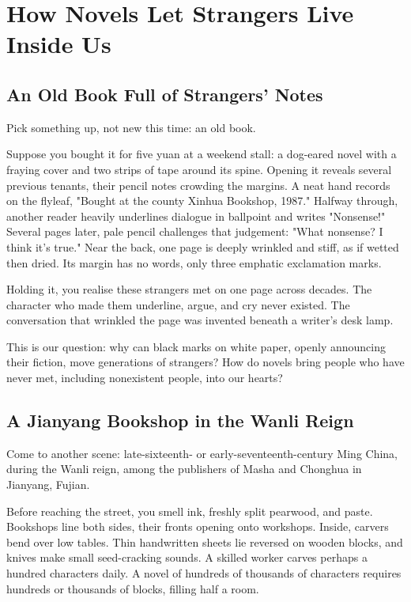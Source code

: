 \chapter[Strangers Inside Us: Novels]{How Novels Let Strangers Live Inside Us}
\section{An Old Book Full of Strangers' Notes}
Pick something up, not new this time: an old book.

Suppose you bought it for five yuan at a weekend stall: a dog-eared novel with a fraying cover and two strips of tape around its spine. Opening it reveals several previous tenants, their pencil notes crowding the margins. A neat hand records on the flyleaf, "Bought at the county Xinhua Bookshop, 1987." Halfway through, another reader heavily underlines dialogue in ballpoint and writes "Nonsense!" Several pages later, pale pencil challenges that judgement: "What nonsense? I think it's true." Near the back, one page is deeply wrinkled and stiff, as if wetted then dried. Its margin has no words, only three emphatic exclamation marks.

Holding it, you realise these strangers met on one page across decades. The character who made them underline, argue, and cry never existed. The conversation that wrinkled the page was invented beneath a writer's desk lamp.

This is our question: why can black marks on white paper, openly announcing their fiction, move generations of strangers? How do novels bring people who have never met, including nonexistent people, into our hearts?

\section{A Jianyang Bookshop in the Wanli Reign}
Come to another scene: late-sixteenth- or early-seventeenth-century Ming China, during the Wanli reign, among the publishers of Masha and Chonghua in Jianyang, Fujian.

Before reaching the street, you smell ink, freshly split pearwood, and paste. Bookshops line both sides, their fronts opening onto workshops. Inside, carvers bend over low tables. Thin handwritten sheets lie reversed on wooden blocks, and knives make small seed-cracking sounds. A skilled worker carves perhaps a hundred characters daily. A novel of hundreds of thousands of characters requires hundreds or thousands of blocks, filling half a room.

